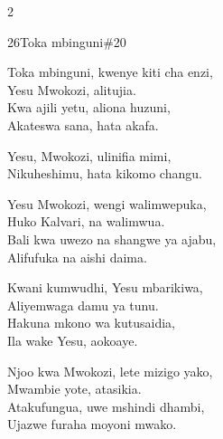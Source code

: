 \begin{multicols}{2}
\begin{hymn}{26}{Toka mbinguni}{\#20}
\begin{stanza}
Toka mbinguni, kwenye kiti cha enzi,\\
Yesu Mwokozi, alitujia.\\
Kwa ajili yetu, aliona huzuni,\\
Akateswa sana, hata akafa.
\end{stanza}
\begin{chorus}
Yesu, Mwokozi, ulinifia mimi,\\
Nikuheshimu, hata kikomo changu.
\end{chorus}
\begin{stanza}
Yesu Mwokozi, wengi walimwepuka,\\
Huko Kalvari, na walimwua.\\
Bali kwa uwezo na shangwe ya ajabu,\\
Alifufuka na aishi daima.
\end{stanza}
\begin{stanza}
Kwani kumwudhi, Yesu mbarikiwa,\\
Aliyemwaga damu ya tunu.\\
Hakuna mkono wa kutusaidia,\\
Ila wake Yesu, aokoaye.
\end{stanza}
\begin{stanza}
Njoo kwa Mwokozi, lete mizigo yako,\\
Mwambie yote, atasikia.\\
Atakufungua, uwe mshindi dhambi,\\
Ujazwe furaha moyoni mwako.
\end{stanza}
\end{hymn}


\end{multicols}
